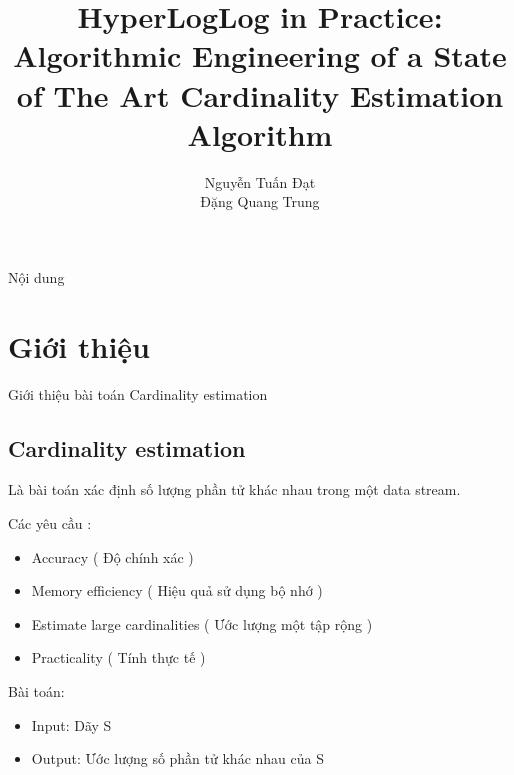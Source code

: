 \documentclass{beamer}
\title[]{{\bf \large HyperLogLog in Practice: Algorithmic Engineering of a
State of The Art Cardinality Estimation Algorithm } \\
}
\author[]{
Nguyễn Tuấn Đạt \\%
Đặng Quang Trung%
}
\institute[]{

}
\begin{document}
\begin{frame}
\titlepage
\end{frame}

\begin{frame}{Nội dung}
\tableofcontents
\end{frame}
\section{Giới thiệu}

\begin{frame}{Giới thiệu bài toán Cardinality estimation}
\subsection{Cardinality estimation}
Là bài toán xác định số lượng phần tử khác nhau trong một data stream. 

Các yêu cầu :
\begin{itemize}
\item Accuracy ( Độ chính xác )
\item Memory efficiency ( Hiệu quả sử dụng bộ nhớ )
\item Estimate large cardinalities ( Ước lượng một tập rộng )
\item Practicality ( Tính thực tế )
\end{itemize}

\end{frame}
\begin{frame}
\color{hilight} Bài toán: 
\begin{itemize}
\item Input: Dãy S
\item Output: Ước lượng số phần tử khác nhau của S
\end{itemize}
\end{frame}
\end{document}

